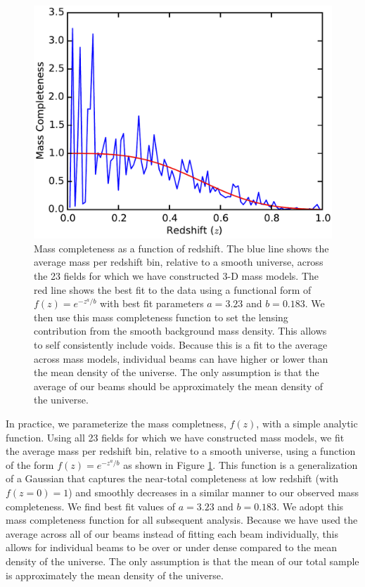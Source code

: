 \documentclass{emulateapj}
\begin{document}
\begin{figure}[t]
\begin{center}
\includegraphics[width=\columnwidth]{mass_completeness.pdf}
\caption{\label{fig:mass_complete} Mass completeness as a function of redshift. The blue line shows the average mass per redshift bin, relative to a smooth universe, across the 23 fields for which we have constructed 3-D mass models. The red line shows the best fit to the data using a functional form of $f(z) = e^{-z^a / b}$ with best fit parameters $a = 3.23$ and $b = 0.183$. We then use this mass completeness function to set the lensing contribution from the smooth background mass density. This allows to self consistently include voids. Because this is a fit to the average across mass models, individual beams can have higher or lower than the mean density of the universe. The only assumption is that the average of our beams should be approximately the mean density of the universe.
}
\end{center}
\end{figure}

In practice, we parameterize the mass completness, $f(z)$, with a simple analytic function. Using all 23 fields for which we have constructed mass models, we fit the average mass per redshift bin, relative to a smooth universe, using a function of the form $f(z) = e^{-z^a / b}$ as shown in Figure \ref{fig:mass_complete}. This function is a generalization of a Gaussian that captures the near-total completeness at low redshift (with $f(z=0) = 1$) and smoothly decreases in a similar manner to our observed mass completeness. We find best fit values of $a = 3.23$ and $b = 0.183$. We adopt this mass completeness function for all subsequent analysis. Because we have used the average across all of our beams instead of fitting each beam individually, this allows for individual beams to be over or under dense compared to the mean density of the universe. The only assumption is that the mean of our total sample is approximately the mean density of the universe. 
\end{document}

